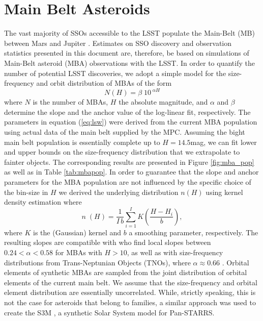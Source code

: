 \section{Main Belt Asteroids} \label{sec:mba}
The vast majority of SSOs accessible to the \gls{LSST} populate the Main-Belt (\gls{MB}) between Mars and Jupiter \citep{LSSTscibook2009}. Estimates on \gls{SSO} discovery and observation statistics presented in this document are, therefore, be based on simulations of Main-Belt asteroid (MBA) observations with the \gls{LSST}. 
In order to quantify the number of potential \gls{LSST} discoveries, we adopt a simple model for the size-frequency and orbit distribution of MBAs of the form
\begin{equation}
 N(H)=\beta\;10^{\;\alpha H}
 \label{eq:lsw}
\end{equation}
where $N$ is the number of MBAs, $H$ the absolute magnitude, and $\alpha$ and $\beta$ determine the slope and the anchor value of the log-linear fit, respectively.
The parameters in equation (\ref{eq:lsw}) were derived from the current MBA population using actual data of the main belt supplied by the \gls{MPC}. 
Assuming the bight main belt population is essentially complete up to $H=14.5$mag, we can fit lower and upper bounds on the size-frequency distribution that we extrapolate to fainter objects. The corresponding results are presented in Figure \ref{fig:mba_pop} as well as in Table \ref{tab:mbapop}.
In order to guarantee that the slope and anchor parameters for the MBA population are not influenced by the specific choice of the bin-size in $H$ we derived the underlying distribution $n(H)$ using kernel density estimation where
\begin{equation}
 n\;(H)=\frac{1}{I\,b} \sum_{i=1}^{I} K\left(\frac{H-H_i}{b}\right),
 \label{eggl:eq:kernel}
\end{equation}
where $K$ is the (Gaussian) kernel and $b$ a smoothing parameter, respectively. The resulting slopes are compatible with \citet{jedicke2002} who find local slopes between $0.24<\alpha<0.58$ for MBAs with $H>10$, as well as with size-frequency distributions from Trans-Neptunian Objects (TNOs), where $\alpha\approx0.66$ \citep{bernstein2004}.
Orbital elements of synthetic MBAs are sampled from the joint distribution of orbital elements of the current main belt. We assume that the size-frequency and orbital element distribution are essentially uncorrelated. While, strictly speaking, this is not the case for asteroids that belong to families, a similar approach was used to create the S3M \citep{s3m}, a synthetic Solar System model for \gls{Pan-STARRS}.

